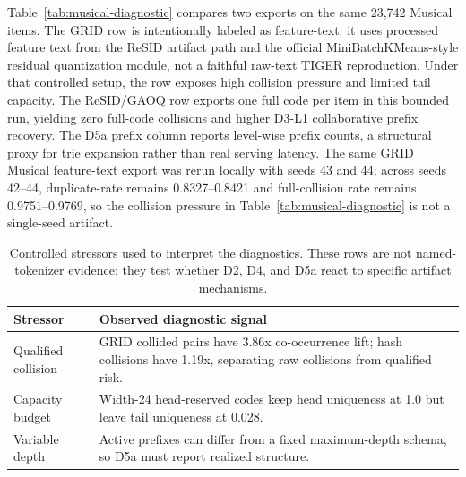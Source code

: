 Table~\ref{tab:musical-diagnostic} compares two exports on the same 23,742
Musical items. The GRID row is intentionally labeled as feature-text: it uses
processed feature text from the ReSID artifact path and the official
MiniBatchKMeans-style residual quantization module, not a faithful raw-text
TIGER reproduction. Under that controlled setup, the row exposes high collision
pressure and limited tail capacity. The ReSID/GAOQ row exports one full code
per item in this bounded run, yielding zero full-code collisions and higher
D3-L1 collaborative prefix recovery. The D5a prefix column reports level-wise
prefix counts, a structural proxy for trie expansion rather than real serving
latency.
The same GRID Musical feature-text export was rerun locally with seeds 43 and
44; across seeds 42--44, duplicate-\sid rate remains 0.8327--0.8421 and
full-collision rate remains 0.9751--0.9769, so the collision pressure in
Table~\ref{tab:musical-diagnostic} is not a single-seed artifact.

\begin{table}[H]
\caption{Controlled stressors used to interpret the diagnostics. These rows are
not named-tokenizer evidence; they test whether D2, D4, and D5a react to
specific artifact mechanisms.}
\label{tab:controller-stressors}
\small
\setlength{\tabcolsep}{2.5pt}
\begin{tabularx}{\columnwidth}{@{}p{}Y@{}}
\toprule
Stressor & Observed diagnostic signal \\
\midrule
Qualified collision & GRID collided pairs have 3.86x co-occurrence lift;
hash collisions have 1.19x, separating raw collisions from qualified risk. \\
Capacity budget & Width-24 head-reserved codes keep head uniqueness at 1.0
but leave tail uniqueness at 0.028. \\
Variable depth & Active prefixes can differ from a fixed maximum-depth schema,
so D5a must report realized structure. \\
\bottomrule
\end{tabularx}
\end{table}


